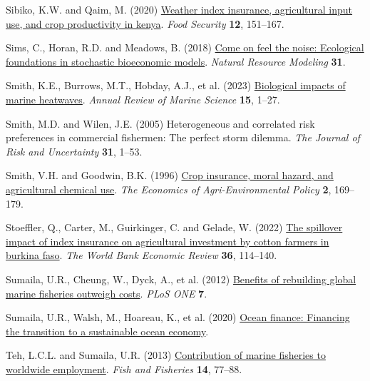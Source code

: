\documentclass[
  letterpaper,
  DIV=11,
  numbers=noendperiod]{scrartcl}
\newlength{\cslhangindent}
\newlength{\cslentryspacingunit} %
\newenvironment{CSLReferences}[2] %
 {%
  \setlength{\parindent}{0pt}
  \ifodd #1
  \let\oldpar\par
  \def\par{\hangindent=\cslhangindent\oldpar}
  \fi
  \setlength{\parskip}{#2\cslentryspacingunit}
 }%
 {}
\theoremstyle{plain}
\theoremstyle{plain}
\theoremstyle{remark}
\begin{document}
\begin{CSLReferences}{1}{0}
\leavevmode{}%
Sibiko, K.W. and Qaim, M. (2020)
\href{https://doi.org/10.1007/s12571-019-00987-y}{Weather index
insurance, agricultural input use, and crop productivity in kenya}.
\emph{Food Security} \textbf{12}, 151--167.

\leavevmode{}%
Sims, C., Horan, R.D. and Meadows, B. (2018)
\href{https://doi.org/10.1111/NRM.12191}{Come on feel the noise:
Ecological foundations in stochastic bioeconomic models}. \emph{Natural
Resource Modeling} \textbf{31}.

\leavevmode{}%
Smith, K.E., Burrows, M.T., Hobday, A.J., et al. (2023)
\href{https://doi.org/10.1146/annurev-marine-032122-121437}{Biological
impacts of marine heatwaves}. \emph{Annual Review of Marine Science}
\textbf{15}, 1--27.

\leavevmode{}%
Smith, M.D. and Wilen, J.E. (2005) Heterogeneous and correlated risk
preferences in commercial fishermen: The perfect storm dilemma.
\emph{The Journal of Risk and Uncertainty} \textbf{31}, 1--53.

\leavevmode{}%
Smith, V.H. and Goodwin, B.K. (1996)
\href{https://doi.org/10.2307/1243714}{Crop insurance, moral hazard, and
agricultural chemical use}. \emph{The Economics of Agri-Environmental
Policy} \textbf{2}, 169--179.

\leavevmode{}%
Stoeffler, Q., Carter, M., Guirkinger, C. and Gelade, W. (2022)
\href{https://doi.org/10.1093/wber}{The spillover impact of index
insurance on agricultural investment by cotton farmers in burkina faso}.
\emph{The World Bank Economic Review} \textbf{36}, 114--140.

\leavevmode{}%
Sumaila, U.R., Cheung, W., Dyck, A., et al. (2012)
\href{https://doi.org/10.1371/journal.pone.0040542}{Benefits of
rebuilding global marine fisheries outweigh costs}. \emph{PLoS ONE}
\textbf{7}.

\leavevmode{}%
Sumaila, U.R., Walsh, M., Hoareau, K., et al. (2020)
\href{https://www.oceanpanel.org/blue-}{Ocean finance: Financing the
transition to a sustainable ocean economy}.

\leavevmode{}%
Teh, L.C.L. and Sumaila, U.R. (2013)
\href{https://doi.org/10.1111/j.1467-2979.2011.00450.x}{Contribution of
marine fisheries to worldwide employment}. \emph{Fish and Fisheries}
\textbf{14}, 77--88.


\end{CSLReferences}
\end{document}
